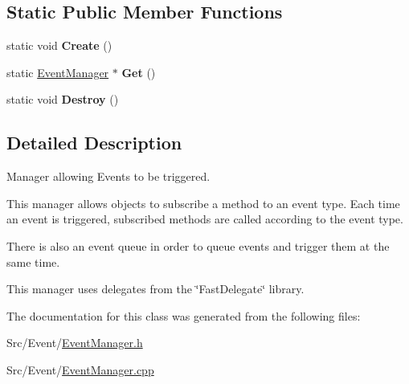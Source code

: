 \subsection*{Static Public Member Functions}
\begin{DoxyCompactItemize}
\item 
\hypertarget{classEventManager_a17e2eb6bfbe1411181199cbab5f5a856}{static void {\bfseries Create} ()}\label{classEventManager_a17e2eb6bfbe1411181199cbab5f5a856}

\item 
\hypertarget{classEventManager_ac8154ede54d2ca9c81c2530f903b20fe}{static \hyperlink{classEventManager}{Event\-Manager} $\ast$ {\bfseries Get} ()}\label{classEventManager_ac8154ede54d2ca9c81c2530f903b20fe}

\item 
\hypertarget{classEventManager_a20549fbf6c5ee69f79b38d31f6194ed4}{static void {\bfseries Destroy} ()}\label{classEventManager_a20549fbf6c5ee69f79b38d31f6194ed4}

\end{DoxyCompactItemize}


\subsection{Detailed Description}
Manager allowing Events to be triggered. 

This manager allows objects to subscribe a method to an event type. Each time an event is triggered, subscribed methods are called according to the event type.

There is also an event queue in order to queue events and trigger them at the same time.

This manager uses delegates from the \char`\"{}\-Fast\-Delegate\char`\"{} library. 

The documentation for this class was generated from the following files\-:\begin{DoxyCompactItemize}
\item 
Src/\-Event/\hyperlink{EventManager_8h}{Event\-Manager.\-h}\item 
Src/\-Event/\hyperlink{EventManager_8cpp}{Event\-Manager.\-cpp}\end{DoxyCompactItemize}
